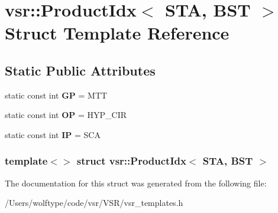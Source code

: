 \hypertarget{structvsr_1_1_product_idx_3_01_s_t_a_00_01_b_s_t_01_4}{\section{vsr\-:\-:Product\-Idx$<$ S\-T\-A, B\-S\-T $>$ Struct Template Reference}
\label{structvsr_1_1_product_idx_3_01_s_t_a_00_01_b_s_t_01_4}
}
\subsection*{Static Public Attributes}
\begin{DoxyCompactItemize}
\item 
\hypertarget{structvsr_1_1_product_idx_3_01_s_t_a_00_01_b_s_t_01_4_a6b5001cadb8e0990d464e075a049a6c4}{static const int {\bfseries G\-P} = M\-T\-T}\label{structvsr_1_1_product_idx_3_01_s_t_a_00_01_b_s_t_01_4_a6b5001cadb8e0990d464e075a049a6c4}

\item 
\hypertarget{structvsr_1_1_product_idx_3_01_s_t_a_00_01_b_s_t_01_4_acada82f2f830fbfa450ff1e8b83d9816}{static const int {\bfseries O\-P} = H\-Y\-P\-\_\-\-C\-I\-R}\label{structvsr_1_1_product_idx_3_01_s_t_a_00_01_b_s_t_01_4_acada82f2f830fbfa450ff1e8b83d9816}

\item 
\hypertarget{structvsr_1_1_product_idx_3_01_s_t_a_00_01_b_s_t_01_4_a471eca8a3dd4529c873be214eca6a254}{static const int {\bfseries I\-P} = S\-C\-A}\label{structvsr_1_1_product_idx_3_01_s_t_a_00_01_b_s_t_01_4_a471eca8a3dd4529c873be214eca6a254}

\end{DoxyCompactItemize}
\subsubsection*{template$<$$>$ struct vsr\-::\-Product\-Idx$<$ S\-T\-A, B\-S\-T $>$}



The documentation for this struct was generated from the following file\-:\begin{DoxyCompactItemize}
\item 
/\-Users/wolftype/code/vsr/\-V\-S\-R/vsr\-\_\-templates.\-h\end{DoxyCompactItemize}

